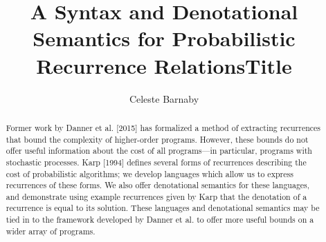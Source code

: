 \documentclass[12pt]{westhesis}
\title{A Syntax and Denotational Semantics for Probabilistic Recurrence Relations}
\theoremstyle{plain}
\theoremstyle{definition}
\begin{document}
\begin{abstract}
Former work by Danner et al. [2015] has formalized a method of extracting recurrences that bound the complexity
of higher-order programs. However, these bounds do not offer useful information about the cost of all programs---in particular,
programs with stochastic processes. Karp [1994] defines several forms of recurrences describing the cost of probabilistic
algorithms; we develop languages which allow us to express recurrences of these forms. We also offer denotational semantics for these languages, and demonstrate using example recurrences given by Karp that the denotation of a recurrence is equal to its solution. These languages and denotational semantics may be tied in to the framework developed by Danner et al. to offer
more useful bounds on a wider array of programs.
\end{abstract}

\title{Title}
\author{Celeste Barnaby}

\maketitle
\makededication
\makeabstract
\tableofcontents









\end{document}
